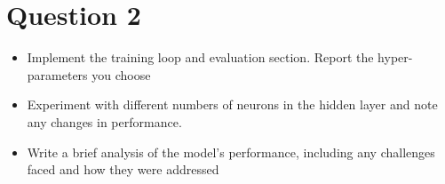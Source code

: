 
\section{Question 2}

\begin{itemize}
    \item  Implement the training loop and evaluation section. Report the hyper-parameters you choose
    
    \item Experiment with different numbers of neurons in the hidden layer and note any changes in performance.
    
    \item Write a brief analysis of the model’s performance, including any challenges faced and how they were addressed
\end{itemize}

